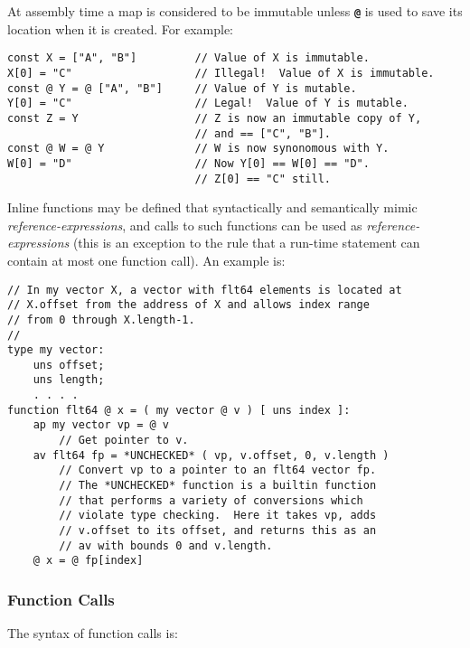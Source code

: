 \documentclass[12pt]{article}
\newcommand{\TT}[1]{{\tt \bfseries #1}}
\newcommand{\EOL}{\penalty \exhyphenpenalty}
\newenvironment{indpar}[1][0.3in]%
	{\begin{list}{}%
		     {\setlength{\itemsep}{0in}%
		      \setlength{\topsep}{0in}%
		      \setlength{\parsep}{1ex}%
		      \setlength{\labelwidth}{#1}%
		      \setlength{\leftmargin}{#1}%
		      \addtolength{\leftmargin}{\labelsep}}%
	 \item}%
	{\end{list}}
\begin{document}
At assembly time a map is considered to be immutable unless
\TT{@} is used to save its location when it is created.  For example:
\begin{indpar}\begin{verbatim}
const X = ["A", "B"]         // Value of X is immutable.
X[0] = "C"                   // Illegal!  Value of X is immutable.
const @ Y = @ ["A", "B"]     // Value of Y is mutable.
Y[0] = "C"                   // Legal!  Value of Y is mutable.
const Z = Y                  // Z is now an immutable copy of Y,
                             // and == ["C", "B"].
const @ W = @ Y              // W is now synonomous with Y.
W[0] = "D"                   // Now Y[0] == W[0] == "D".
                             // Z[0] == "C" still.
\end{verbatim}\end{indpar}


Inline functions may be defined that syntactically and semantically mimic
{\em reference-\EOL expres\-sions}, and calls to such functions
can be used as {\em reference-expressions} (this is an exception
to the rule that a run-time statement can contain at most one function
call).  An example is:
\label{REFERENCE-EXPRESSION-FUNCTION-EXAMPLE}

\begin{indpar}\begin{verbatim}
// In my vector X, a vector with flt64 elements is located at
// X.offset from the address of X and allows index range
// from 0 through X.length-1.
//
type my vector:
    uns offset;
    uns length;
    . . . .
function flt64 @ x = ( my vector @ v ) [ uns index ]:
    ap my vector vp = @ v
        // Get pointer to v.
    av flt64 fp = *UNCHECKED* ( vp, v.offset, 0, v.length )
        // Convert vp to a pointer to an flt64 vector fp.
        // The *UNCHECKED* function is a builtin function
        // that performs a variety of conversions which
        // violate type checking.  Here it takes vp, adds
        // v.offset to its offset, and returns this as an
        // av with bounds 0 and v.length.
    @ x = @ fp[index]
\end{verbatim}\end{indpar}

\subsubsection{Function Calls}
\label{FUNCTION-CALLS}

The syntax of function calls is:
\end{document}
